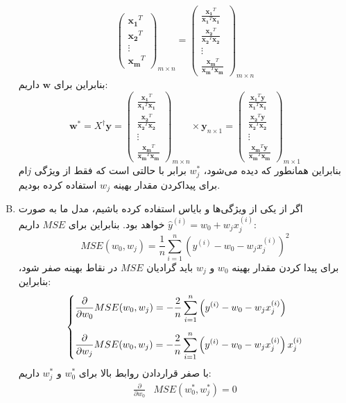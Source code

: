 \documentclass[a4paper, 12pt]{article}
\begin{document}
\begin{enumerate}[A)]
\[\begin{pmatrix}
		\bm{x_1}^T \\
		\bm{x_2}^T \\
		\vdots \\
		\bm{x_m}^T
	\end{pmatrix}_{m\times n} =
	\begin{pmatrix}
		\frac{\bm{x_1}^T}{\bm{x_1}^T\bm{x_1}} \\
		\frac{\bm{x_2}^T}{\bm{x_2}^T\bm{x_2}} \\
		\vdots \\
		\frac{\bm{x_m}^T}{\bm{x_m}^T\bm{x_m}}
	\end{pmatrix}_{m\times n}
	\]
	بنابراین برای $\bm{w}$ داریم:
	\[
	\bm{w}^\ast = X^\dagger \bm{y} = \begin{pmatrix}
		\frac{\bm{x_1}^T}{\bm{x_1}^T\bm{x_1}} \\
		\frac{\bm{x_2}^T}{\bm{x_2}^T\bm{x_2}} \\
		\vdots \\
		\frac{\bm{x_m}^T}{\bm{x_m}^T\bm{x_m}}
	\end{pmatrix}_{m\times n} \times \bm{y}_{n\times 1} = \begin{pmatrix}
		\frac{\bm{x_1}^T\bm{y}}{\bm{x_1}^T\bm{x_1}} \\
		\frac{\bm{x_2}^T\bm{y}}{\bm{x_2}^T\bm{x_2}} \\
		\vdots \\
		\frac{\bm{x_m}^T\bm{y}}{\bm{x_m}^T\bm{x_m}}
	\end{pmatrix}_{m \times 1}
	\]
	بنابراین همانطور که دیده می‌شود، $w_j^\ast$ برابر با حالتی است که فقط از ویژگی $j$ام برای پیداکردن مقدار بهینه $w_j$ استفاده کرده بودیم.
	\item
	اگر از یکی از ویژگی‌ها و بایاس استفاده کرده باشیم، مدل ما به صورت
	$\hat{y}^{(i)} = w_0 + w_jx_j^{(i)}$
	خواهد بود. بنابراین برای $MSE$ داریم:
	\[
	MSE(w_0, w_j) = \frac{1}{n} \sum_{i=1}^n \left(y^{(i)} - w_0 - w_jx_j^{(i)}\right)^2
	\]
	برای پیدا کردن مقدار بهینه $w_0$ و $w_j$ باید گرادیان $MSE$ در نقاط بهینه صفر شود، بنابراین:
	\[
	\begin{dcases}
		\frac{\partial}{\partial w_0} MSE(w_0, w_j) = -\frac{2}{n} \sum_{i=1}^n \left(y^{(i)} - w_0 - w_jx_j^{(i)}\right) \\[0.5em]
		\frac{\partial}{\partial w_j} MSE(w_0, w_j) = -\frac{2}{n} \sum_{i=1}^n \left(y^{(i)} - w_0 - w_jx_j^{(i)}\right)x_j^{(i)}
	\end{dcases}
	\]
	با صفر قراردادن روابط بالا برای $w_0^\ast$ و $w_j^\ast$ داریم:
	\[
	\begin{aligned}
		\frac{\partial}{\partial w_0}&MSE(w_0^\ast, w_j^\ast) = 0 \\[0.5em]

\end{aligned}\]
\end{enumerate}
\end{document}
